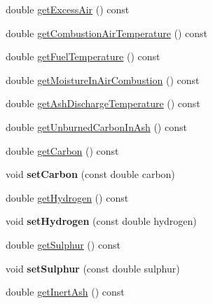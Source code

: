 \begin{DoxyCompactItemize}
\item 
double \hyperlink{class_solid_liquid_flue_gas_material_a49e7bb4ebc45897c81b6f38610ceaf02}{get\+Excess\+Air} () const
\item 
double \hyperlink{class_solid_liquid_flue_gas_material_a8757b831e5a2ef26dbb0cf271c0e8207}{get\+Combustion\+Air\+Temperature} () const
\item 
double \hyperlink{class_solid_liquid_flue_gas_material_a629ecc7104b6bfbb696d9478c4b48e7a}{get\+Fuel\+Temperature} () const
\item 
double \hyperlink{class_solid_liquid_flue_gas_material_ae3d9780851b8217ed2885753f11ec18b}{get\+Moisture\+In\+Air\+Combustion} () const
\item 
double \hyperlink{class_solid_liquid_flue_gas_material_ab233d4e27397cc74fbe2d3084e4e6f7c}{get\+Ash\+Discharge\+Temperature} () const
\item 
double \hyperlink{class_solid_liquid_flue_gas_material_a53ac34a949168a35297ab3afb9eb2c7b}{get\+Unburned\+Carbon\+In\+Ash} () const
\item 
double \hyperlink{class_solid_liquid_flue_gas_material_a7b8a98111943d30094e2d6950f7f2ec1}{get\+Carbon} () const
\item 
\mbox{\label{class_solid_liquid_flue_gas_material_ab89eddf949fefcc1ade049233c2dc12b}} 
void {\bfseries set\+Carbon} (const double carbon)
\item 
double \hyperlink{class_solid_liquid_flue_gas_material_a26af2edd53c50b071648d03bc6442fb6}{get\+Hydrogen} () const
\item 
\mbox{\label{class_solid_liquid_flue_gas_material_a44788e445519bb719a8ff9ca04702e21}} 
void {\bfseries set\+Hydrogen} (const double hydrogen)
\item 
double \hyperlink{class_solid_liquid_flue_gas_material_abe35d8ff283bfa5aadcf00f9906025ae}{get\+Sulphur} () const
\item 
\mbox{\label{class_solid_liquid_flue_gas_material_a34e4eaeb424bcf02dc29a5ab98172ef5}} 
void {\bfseries set\+Sulphur} (const double sulphur)
\item 
double \hyperlink{class_solid_liquid_flue_gas_material_a0549b32b7b5423267d5f59cc96b98127}{get\+Inert\+Ash} () const
\item 
\mbox{\label{class_solid_liquid_flue_gas_material_a75a066ed50d810d5699fd53cb4376dc8}} 

\end{DoxyCompactItemize}
